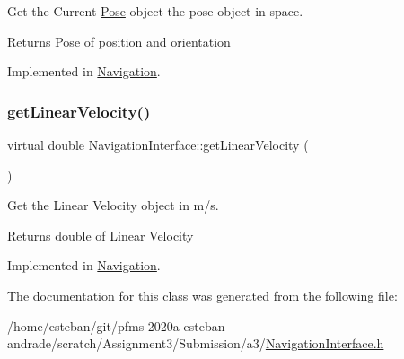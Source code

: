 Get the Current \hyperlink{structPose}{Pose} object the pose object in space. 

\begin{DoxyReturn}{Returns}
\hyperlink{structPose}{Pose} of position and orientation 
\end{DoxyReturn}


Implemented in \hyperlink{classNavigation_af82fc8cc1546fa2a54e8a8651c1adc80}{Navigation}.

\mbox{\label{classNavigationInterface_aa5c9df2654078875f72368e919e28432}} 
\subsubsection{\texorpdfstring{get\+Linear\+Velocity()}{getLinearVelocity()}}
{\footnotesize\ttfamily virtual double Navigation\+Interface\+::get\+Linear\+Velocity (\begin{DoxyParamCaption}{ }\end{DoxyParamCaption})\hspace{0.3cm}{\ttfamily [pure virtual]}}



Get the Linear Velocity object in m/s. 

\begin{DoxyReturn}{Returns}
double of Linear Velocity 
\end{DoxyReturn}


Implemented in \hyperlink{classNavigation_a9aef484e223556a207734159612fb2c9}{Navigation}.



The documentation for this class was generated from the following file\+:\begin{DoxyCompactItemize}
\item 
/home/esteban/git/pfms-\/2020a-\/esteban-\/andrade/scratch/\+Assignment3/\+Submission/a3/\hyperlink{NavigationInterface_8h}{Navigation\+Interface.\+h}\end{DoxyCompactItemize}
